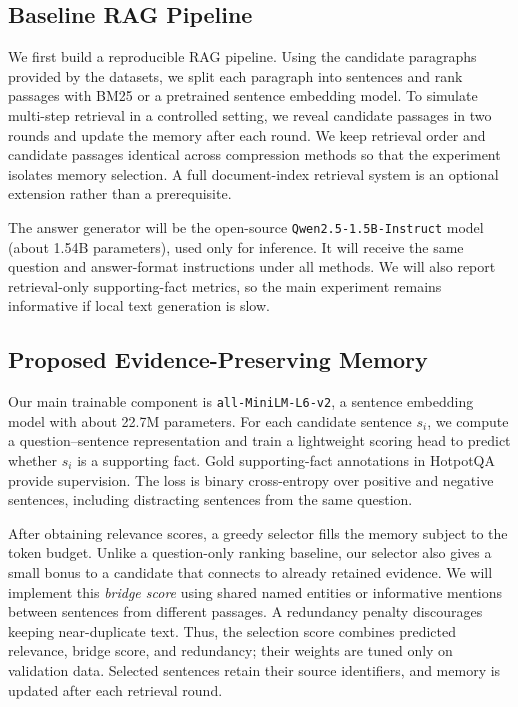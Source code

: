 \documentclass[11pt]{article}
\begin{document}
\subsection{Baseline RAG Pipeline}

We first build a reproducible RAG pipeline. Using the candidate paragraphs provided by the datasets, we split each paragraph into sentences and rank passages with BM25 or a pretrained sentence embedding model. To simulate multi-step retrieval in a controlled setting, we reveal candidate passages in two rounds and update the memory after each round. We keep retrieval order and candidate passages identical across compression methods so that the experiment isolates memory selection. A full document-index retrieval system is an optional extension rather than a prerequisite.

The answer generator will be the open-source \texttt{Qwen2.5-1.5B-Instruct} model (about 1.54B parameters), used only for inference. It will receive the same question and answer-format instructions under all methods. We will also report retrieval-only supporting-fact metrics, so the main experiment remains informative if local text generation is slow.

\subsection{Proposed Evidence-Preserving Memory}

Our main trainable component is \texttt{all-MiniLM-L6-v2}, a sentence embedding model with about 22.7M parameters. For each candidate sentence $s_i$, we compute a question--sentence representation and train a lightweight scoring head to predict whether $s_i$ is a supporting fact. Gold supporting-fact annotations in HotpotQA provide supervision. The loss is binary cross-entropy over positive and negative sentences, including distracting sentences from the same question.

After obtaining relevance scores, a greedy selector fills the memory subject to the token budget. Unlike a question-only ranking baseline, our selector also gives a small bonus to a candidate that connects to already retained evidence. We will implement this \emph{bridge score} using shared named entities or informative mentions between sentences from different passages. A redundancy penalty discourages keeping near-duplicate text. Thus, the selection score combines predicted relevance, bridge score, and redundancy; their weights are tuned only on validation data. Selected sentences retain their source identifiers, and memory is updated after each retrieval round.
\end{document}
